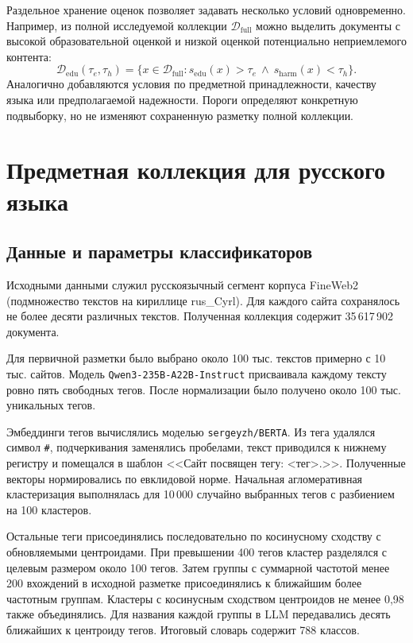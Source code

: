 \documentclass[12pt,a4paper]{article}
\begin{document}
Раздельное хранение оценок позволяет задавать несколько условий одновременно.
Например, из полной исследуемой коллекции $\mathcal D_{\mathrm{full}}$ можно выделить документы
с высокой образовательной оценкой и низкой оценкой потенциально неприемлемого контента:
\begin{equation}
\mathcal D_{\mathrm{edu}}(\tau_e,\tau_h)=
\{x\in\mathcal D_{\mathrm{full}}:
s_{\mathrm{edu}}(x)>\tau_e\ \land\ s_{\mathrm{harm}}(x)<\tau_h\}.
\end{equation}
Аналогично добавляются условия по предметной принадлежности, качеству языка
или предполагаемой надежности. Пороги определяют конкретную подвыборку,
но не изменяют сохраненную разметку полной коллекции.

\section{Предметная коллекция для русского языка}

\subsection{Данные и параметры классификаторов}
Исходными данными служил русскоязычный сегмент корпуса FineWeb2 (подмножество текстов на кириллице rus\_Cyrl).
Для каждого сайта сохранялось не более десяти различных текстов.
Полученная коллекция содержит 35\,617\,902 документа.

Для первичной разметки было выбрано около 100 тыс. текстов примерно с 10 тыс. сайтов.
Модель \texttt{Qwen3-235B-A22B-Instruct} присваивала каждому тексту ровно пять свободных тегов.
После нормализации было получено около 100 тыс. уникальных тегов.

Эмбеддинги тегов вычислялись моделью \texttt{sergeyzh/BERTA}.
Из тега удалялся символ \texttt{\#}, подчеркивания заменялись пробелами,
текст приводился к нижнему регистру и помещался в шаблон <<Сайт посвящен тегу: <тег>.>>.
Полученные векторы нормировались по евклидовой норме.
Начальная агломеративная кластеризация выполнялась для 10\,000 случайно выбранных тегов
с разбиением на 100 кластеров.

Остальные теги присоединялись последовательно по косинусному сходству с обновляемыми центроидами.
При превышении 400 тегов кластер разделялся с целевым размером около 100 тегов.
Затем группы с суммарной частотой менее 200 вхождений в исходной разметке
присоединялись к ближайшим более частотным группам.
Кластеры с косинусным сходством центроидов не менее 0,98 также объединялись.
Для названия каждой группы в LLM передавались десять ближайших к центроиду тегов.
Итоговый словарь содержит 788 классов.
\end{document}
